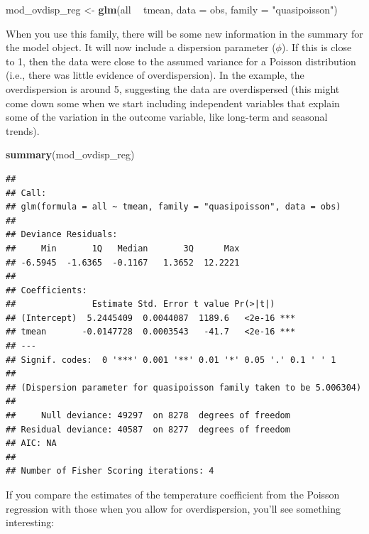 \documentclass[
]{book}
\newenvironment{Shaded}{\begin{snugshade}}{\end{snugshade}}
\newcommand{\DataTypeTok}[1]{\textcolor[rgb]{0.13,0.29,0.53}{#1}}
\newcommand{\KeywordTok}[1]{\textcolor[rgb]{0.13,0.29,0.53}{\textbf{#1}}}
\newcommand{\NormalTok}[1]{#1}
\newcommand{\OperatorTok}[1]{\textcolor[rgb]{0.81,0.36,0.00}{\textbf{#1}}}
\newcommand{\StringTok}[1]{\textcolor[rgb]{0.31,0.60,0.02}{#1}}
\begin{document}
\begin{Shaded}
\begin{Highlighting}[]
\NormalTok{mod_ovdisp_reg <-}\StringTok{ }\KeywordTok{glm}\NormalTok{(all }\OperatorTok{~}\StringTok{ }\NormalTok{tmean, }\DataTypeTok{data =}\NormalTok{ obs, }\DataTypeTok{family =} \StringTok{"quasipoisson"}\NormalTok{)}
\end{Highlighting}
\end{Shaded}

When you use this family, there will be some new information in the summary
for the model object. It will now include a dispersion parameter (\(\phi\)). If this
is close to 1, then the data were close to the assumed variance for a Poisson
distribution (i.e., there was little evidence of overdispersion). In the
example, the overdispersion is around 5, suggesting the data are overdispersed
(this might come down some when we start including independent variables that
explain some of the variation in the outcome variable, like long-term and
seasonal trends).

\begin{Shaded}
\begin{Highlighting}[]
\KeywordTok{summary}\NormalTok{(mod_ovdisp_reg)}
\end{Highlighting}
\end{Shaded}

\begin{verbatim}
## 
## Call:
## glm(formula = all ~ tmean, family = "quasipoisson", data = obs)
## 
## Deviance Residuals: 
##     Min       1Q   Median       3Q      Max  
## -6.5945  -1.6365  -0.1167   1.3652  12.2221  
## 
## Coefficients:
##               Estimate Std. Error t value Pr(>|t|)    
## (Intercept)  5.2445409  0.0044087  1189.6   <2e-16 ***
## tmean       -0.0147728  0.0003543   -41.7   <2e-16 ***
## ---
## Signif. codes:  0 '***' 0.001 '**' 0.01 '*' 0.05 '.' 0.1 ' ' 1
## 
## (Dispersion parameter for quasipoisson family taken to be 5.006304)
## 
##     Null deviance: 49297  on 8278  degrees of freedom
## Residual deviance: 40587  on 8277  degrees of freedom
## AIC: NA
## 
## Number of Fisher Scoring iterations: 4
\end{verbatim}

If you compare the estimates of the temperature coefficient from the Poisson
regression with those when you allow for overdispersion, you'll see something
interesting:

\begin{Shaded}
\end{Shaded}
\end{document}

